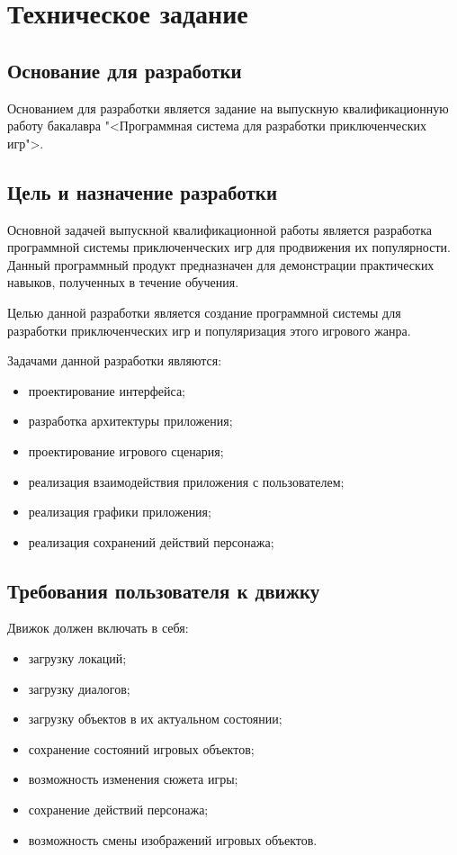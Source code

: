 \section{Техническое задание}
\subsection{Основание для разработки}

Основанием для разработки является задание на выпускную квалификационную работу бакалавра "<Программная система для разработки приключенческих игр">.

\subsection{Цель и назначение разработки}

Основной задачей выпускной квалификационной работы является разработка программной системы приключенческих игр для продвижения их популярности. Данный программный продукт предназначен для демонстрации практических навыков, полученных в течение обучения.

Целью данной разработки является создание программной системы для разработки приключенческих игр и популяризация этого игрового жанра.

Задачами данной разработки являются:
\begin{itemize}
\item проектирование интерфейса;
\item разработка архитектуры приложения;
\item проектирование игрового сценария;
\item реализация взаимодействия приложения с пользователем;
\item реализация графики приложения;
\item реализация сохранений действий персонажа;
\end{itemize}

\subsection{Требования пользователя к движку}

Движок должен включать в себя:
\begin{itemize}
    \item загрузку локаций;
    \item загрузку диалогов;
    \item загрузку объектов в их актуальном состоянии;
    \item сохранение состояний игровых объектов;
    \item возможность изменения сюжета игры;
    \item сохранение действий персонажа;
    \item возможность смены изображений игровых объектов.
\end{itemize}

